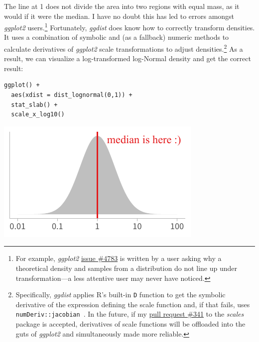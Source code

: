 \documentclass[journal]{vgtc}              %
\begin{document}
The line at 1 does not divide the area into two regions with equal mass, as it would if it were the median. I have no doubt this has led to errors amongst \textit{ggplot2} users.\footnote{For example, \textit{ggplot2} \href{https://github.com/tidyverse/ggplot2/issues/4783}{issue \#4783} is written by a user asking why a theoretical density and samples from a distribution do not line up under transformation---a less attentive user may never have noticed.} Fortunately, \textit{ggdist} does know how to correctly transform densities. It uses a combination of symbolic and (as a fallback) numeric methods to calculate derivatives of \textit{ggplot2} scale transformations to adjust densities.\footnote{Specifically, \textit{ggdist} applies R's built-in \texttt{D} function to get the symbolic derivative of the expression defining the scale function and, if that fails, uses \texttt{numDeriv::jacobian}~\cite{gilbert2016numderiv}. In the future, if my \href{https://github.com/r-lib/scales/pull/341}{pull request \#341} to the \textit{scales} package is accepted, derivatives of scale functions will be offloaded into the guts of \textit{ggplot2} and simultaneously made more reliable.} As a result, we can visualize a log-transformed log-Normal density and get the correct result:

\noindent
\begin{minipage}{.5\columnwidth}
\small
\begin{verbatim}
ggplot() +
  aes(xdist = dist_lognormal(0,1)) +
  stat_slab() +
  scale_x_log10()
\end{verbatim}
\end{minipage}%
  \begin{minipage}{.4\columnwidth}
    \centering
    \includegraphics[width=1.2\columnwidth]{figs/3-jacobian-correct.pdf}
  \end{minipage}
\hfill\break
\end{document}
